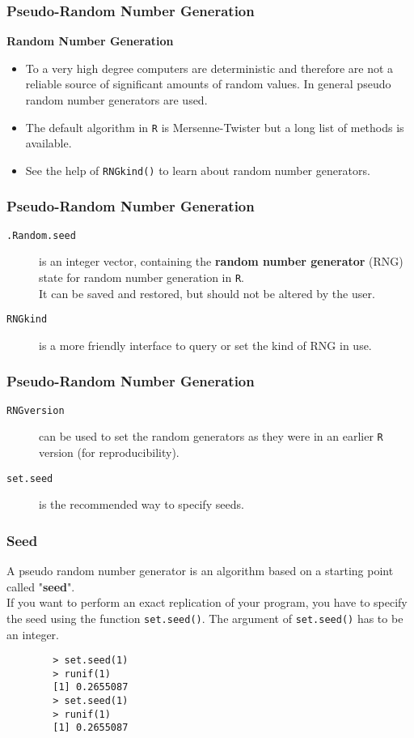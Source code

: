 \documentclass[MAIN.tex]{subfiles}
\begin{document}
 


\begin{frame}
	\frametitle{Pseudo-Random Number Generation}
	\textbf{Random Number Generation}
\begin{itemize}
\item To a very high degree computers are deterministic and therefore are not a reliable source of significant amounts of random values. In general pseudo random number generators are used. 
\item The default algorithm in \texttt{R} is Mersenne-Twister but a long list of methods is available. 
\item See the help of \texttt{RNGkind()} to learn about random number generators.
\end{itemize}
\end{frame}	
\begin{frame}[fragile]
	\frametitle{Pseudo-Random Number Generation}
	\begin{description}		
	\item[\texttt{.Random.seed}] is an integer vector, containing the \textbf{random number generator} (RNG) state for random number generation in \texttt{R}.\\ It can be saved and restored, but should not be altered by the user.
	
	\item[\texttt{RNGkind}] is a more friendly interface to query or set the kind of RNG in use.
	\end{description}
\end{frame}
\begin{frame}
		\frametitle{Pseudo-Random Number Generation}
		\begin{description}	
\item[\texttt{RNGversion}] can be used to set the random generators as they were in an earlier \texttt{R} version (for reproducibility).
	
\item[\texttt{set.seed}] is the recommended way to specify seeds.
	\end{description}
\end{frame}
	\begin{frame}[fragile]
	\frametitle{Seed}
		A pseudo random number generator is an algorithm based on a starting point called "\textbf{seed}". \\ If you want to perform an exact replication of your program, you have to specify the seed using the function \texttt{set.seed()}. The argument of \texttt{set.seed()} has to be an integer.
		
		\begin{framed}
		\begin{verbatim}
		> set.seed(1)
		> runif(1)
		[1] 0.2655087
		> set.seed(1)
		> runif(1)
		[1] 0.2655087
		\end{verbatim}
		\end{framed}
	\end{frame}
\end{document}
